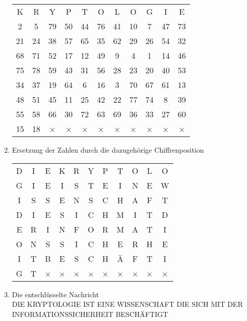 \begin{enumerate}
\begin{center}
\begin{tabular}{ccccccccccc}
K & R & Y & P & T & O & L & O & G & I & E\\
2 & 5 & 79 & 50 & 44 & 76 & 41 & 10 & 7 & 47 & 73\\
21 & 24 & 38 & 57 & 65 & 35 & 62 & 29 & 26 & 54 & 32\\
68 & 71 & 52 & 17 & 12 & 49 & 9 & 4 & 1 & 14 & 46\\
75 & 78 & 59 & 43 & 31 & 56 & 28 & 23 & 20 & 40 & 53\\
34 & 37 & 19 & 64 & 6 & 16 & 3 & 70 & 67 & 61 & 13\\
48 & 51 & 45 & 11 & 25 & 42 & 22 & 77 & 74 & 8 & 39\\
55 & 58 & 66 & 30 & 72 & 63 & 69 & 36 & 33 & 27 & 60\\
15 & 18 & × & × & × & × & × & × & × & × & ×
\end{tabular}
\end{center}

     \item Ersetzung der Zahlen durch die dazugehörige Chiffrenposition\\

\begin{center}
\begin{tabular}{ccccccccccc}
D & I & E & K & R & Y & P & T & O & L & O\\
G & I & E & I & S & T & E & I & N & E & W\\
I & S & S & E & N & S & C & H & A & F & T\\
D & I & E & S & I & C & H & M & I & T & D\\
E & R & I & N & F & O & R & M & A & T & I\\
O & N & S & S & I & C & H & E & R & H & E\\
I & T & B & E & S & C & H & Ä & F & T & I\\
G & T & × & × & × & × & × & × & × & × & ×
\end{tabular}
\end{center}

     \item Die entschlüsselte Nachricht\\
DIE KRYPTOLOGIE IST EINE WISSENSCHAFT DIE SICH MIT DER INFORMATIONSSICHERHEIT BESCHÄFTIGT

 \end{enumerate}

